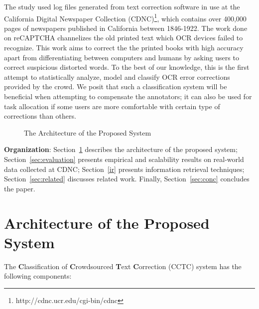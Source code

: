 \documentclass{sig-alternate}
\begin{document}
The study used log files generated from text correction software in use at the California Digital Newspaper Collection (CDNC)\footnote{http://cdnc.ucr.edu/cgi-bin/cdnc}, which contains over 400,000 pages of newspapers published in California between 1846-1922. 
The work done on reCAPTCHA \cite{von2008recaptcha} channelizes the old printed text which OCR devices failed to recognize. This work aims to correct the the printed books with high accuracy apart from differentiating between computers and humans by asking users to correct suspicious distorted words. To the best of our knowledge, this is the first attempt to statistically analyze, model and classify OCR error corrections provided by the crowd. We posit that such a classification system will be beneficial when attempting to compensate the annotators; it can also be used for task allocation if some users are more comfortable with certain type of corrections than others. 
\begin{figure*}[t]
\centering
{}
\caption{The Architecture of the Proposed System}
\label{fig:arch}
\end{figure*}

\noindent \textbf{Organization}: Section~\ref{arch} describes the architecture of the proposed system; Section~\ref{sec:evaluation} presents empirical and scalability results on real-world data collected at CDNC; Section~\ref{ir} presents information retrieval techniques; Section~\ref{sec:related} discusses related work. Finally, Section~\ref{sec:conc} concludes the paper.

\section{Architecture of the Proposed System}
\label{arch}
The \textbf{C}lassification of \textbf{C}rowdsourced \textbf{T}ext \textbf{C}orrection (CCTC) system has the following components:
\end{document}
